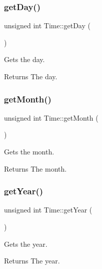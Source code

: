 \subsubsection{\texorpdfstring{get\+Day()}{getDay()}}
{\footnotesize\ttfamily unsigned int Time\+::get\+Day (\begin{DoxyParamCaption}{ }\end{DoxyParamCaption})}



Gets the day. 

\begin{DoxyReturn}{Returns}
The day. 
\end{DoxyReturn}
\mbox{\label{classTime_a22fd86b14d3b067cf1447fd9ca5caf6f}} 
\subsubsection{\texorpdfstring{get\+Month()}{getMonth()}}
{\footnotesize\ttfamily unsigned int Time\+::get\+Month (\begin{DoxyParamCaption}{ }\end{DoxyParamCaption})}



Gets the month. 

\begin{DoxyReturn}{Returns}
The month. 
\end{DoxyReturn}
\mbox{\label{classTime_ade4d01d38041bb86a2e1ded9fd3cd28e}} 
\subsubsection{\texorpdfstring{get\+Year()}{getYear()}}
{\footnotesize\ttfamily unsigned int Time\+::get\+Year (\begin{DoxyParamCaption}{ }\end{DoxyParamCaption})}



Gets the year. 

\begin{DoxyReturn}{Returns}
The year. 
\end{DoxyReturn}
\mbox{\label{classTime_a79d96e150ff808580fdf43932897130d}} 
